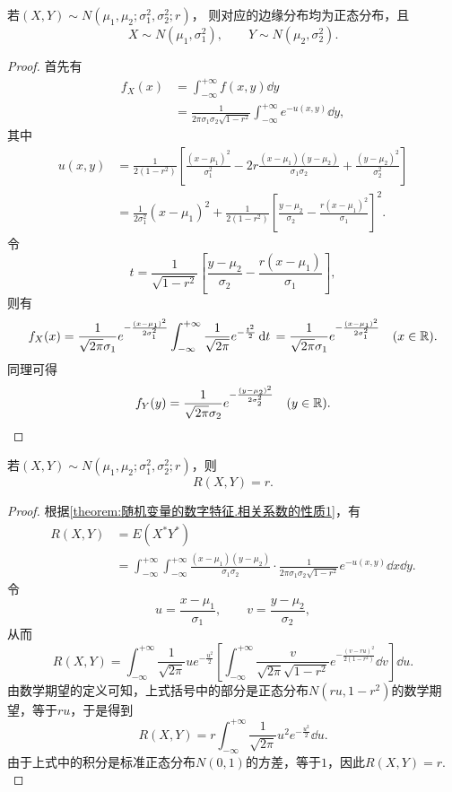\begin{theorem}\label{theorem:正态分布与自然指数分布族.性质1}
若\((X,Y) \sim N(\mu_1,\mu_2;\sigma_1^2,\sigma_2^2;r)\)，%
则对应的边缘分布均为正态分布，且\[
X \sim N(\mu_1,\sigma_1^2),
\qquad
Y \sim N(\mu_2,\sigma_2^2).
\]
\begin{proof}
首先有
\begin{align*}
f_X(x) &= \int_{-\infty}^{+\infty} f(x,y) \dd{y} \\
&= \frac{1}{2\pi\sigma_1\sigma_2\sqrt{1-r^2}}
	\int_{-\infty}^{+\infty} e^{-u(x,y)} \dd{y},
\end{align*}
其中\begin{align*}
u(x,y)
&= \frac{1}{2(1-r^2)} \left[
		\frac{(x-\mu_1)^2}{\sigma_1^2}
		-2r\frac{(x-\mu_1)(y-\mu_2)}{\sigma_1\sigma_2}
		+\frac{(y-\mu_2)^2}{\sigma_2^2}
	\right] \\
&= \frac{1}{2 \sigma_1^2} (x-\mu_1)^2
	+ \frac{1}{2(1-r^2)} \left[
		\frac{y-\mu_2}{\sigma_2}
		- \frac{r(x-\mu_1)^2}{\sigma_1}
	\right]^2.
\end{align*}
令\[
t = \frac{1}{\sqrt{1-r^2}} \left[
\frac{y-\mu_2}{\sigma_2}
- \frac{r(x-\mu_1)}{\sigma_1}
\right],
\]则有\[
f_X(x)
= \frac{1}{\sqrt{2\pi} \sigma_1} e^{-\frac{(x-\mu_1)^2}{2\sigma_1^2}} \int_{-\infty}^{+\infty} \frac{1}{\sqrt{2\pi}} e^{-\frac{t^2}{2}} \dd{t} \\
= \frac{1}{\sqrt{2\pi} \sigma_1} e^{-\frac{(x-\mu_1)^2}{2\sigma_1^2}}
\quad(x\in\mathbb{R}).
\]
同理可得\[
f_Y(y)
= \frac{1}{\sqrt{2\pi} \sigma_2} e^{-\frac{(y-\mu_2)^2}{2\sigma_2^2}}
\quad(y\in\mathbb{R}).
\qedhere
\]
\end{proof}
\end{theorem}

\begin{theorem}\label{theorem:正态分布与自然指数分布族.性质2}
若\((X,Y) \sim N(\mu_1,\mu_2;\sigma_1^2,\sigma_2^2;r)\)，则\[
R(X,Y) = r.
\]
\begin{proof}
根据\cref{theorem:随机变量的数字特征.相关系数的性质1}，有\begin{align*}
R(X,Y)
&= E(X^* Y^*) \\
&= \int_{-\infty}^{+\infty} \int_{-\infty}^{+\infty}
	\frac{(x-\mu_1)(y-\mu_2)}{\sigma_1 \sigma_2}
	\cdot
	\frac{1}{2\pi \sigma_1 \sigma_2 \sqrt{1-r^2}}
	e^{-u(x,y)}
	\dd{x} \dd{y}.
\end{align*}
{%
\def\u{u}%
\def\v{v}%
\def\intx{\int_{-\infty}^{+\infty}}%
令\[
\u = \frac{x-\mu_1}{\sigma_1},
\qquad
\v = \frac{y-\mu_2}{\sigma_2},
\]从而\[
R(X,Y)
= \intx
	\frac{1}{\sqrt{2\pi}}
	\u e^{-\frac{\u^2}{2}}
	\left[
		\intx
		\frac{\v}{\sqrt{2\pi} \sqrt{1-r^2}}
		e^{-\frac{(\v-r\u)^2}{2(1-r^2)}}
		\dd\v
	\right]
	\dd\u.
\]由数学期望的定义可知，上式括号中的部分是正态分布\(N(r\u,1-r^2)\)的数学期望，等于\(r\u\)，于是得到\[
R(X,Y)
= r \intx \frac{1}{\sqrt{2\pi}} \u^2 e^{-\frac{\u^2}{2}} \dd\u.
\]由于上式中的积分是标准正态分布\(N(0,1)\)的方差，等于\(1\)，因此\(R(X,Y) = r\).
}%
\end{proof}
\end{theorem}

